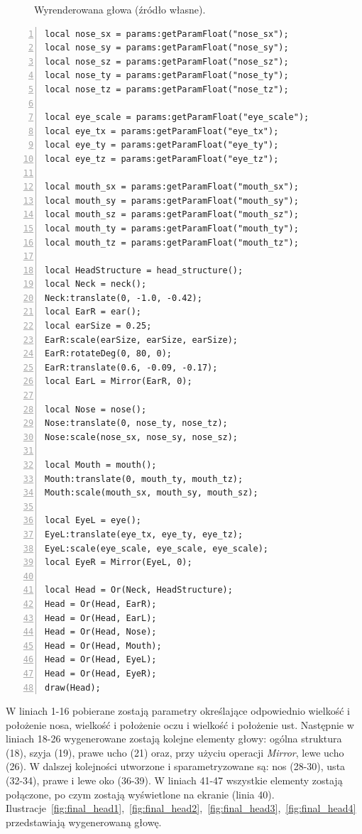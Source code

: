 \begin{figure}[h!]
  \caption{Wyrenderowana głowa (źródło własne).}
  \label{fig:final_head}
\end{figure}

{
\small
\begin{lstlisting}[numbers=left,frame=single,numberstyle=\tiny,backgroundcolor=\color{code_back},breaklines=true]
local nose_sx = params:getParamFloat("nose_sx");
local nose_sy = params:getParamFloat("nose_sy");
local nose_sz = params:getParamFloat("nose_sz");
local nose_ty = params:getParamFloat("nose_ty");
local nose_tz = params:getParamFloat("nose_tz");

local eye_scale = params:getParamFloat("eye_scale");
local eye_tx = params:getParamFloat("eye_tx");
local eye_ty = params:getParamFloat("eye_ty");
local eye_tz = params:getParamFloat("eye_tz");

local mouth_sx = params:getParamFloat("mouth_sx");
local mouth_sy = params:getParamFloat("mouth_sy");
local mouth_sz = params:getParamFloat("mouth_sz");
local mouth_ty = params:getParamFloat("mouth_ty");
local mouth_tz = params:getParamFloat("mouth_tz");

local HeadStructure = head_structure();
local Neck = neck();
Neck:translate(0, -1.0, -0.42);
local EarR = ear();
local earSize = 0.25;
EarR:scale(earSize, earSize, earSize);
EarR:rotateDeg(0, 80, 0);
EarR:translate(0.6, -0.09, -0.17);
local EarL = Mirror(EarR, 0);

local Nose = nose();
Nose:translate(0, nose_ty, nose_tz);
Nose:scale(nose_sx, nose_sy, nose_sz);

local Mouth = mouth();
Mouth:translate(0, mouth_ty, mouth_tz);
Mouth:scale(mouth_sx, mouth_sy, mouth_sz);

local EyeL = eye();
EyeL:translate(eye_tx, eye_ty, eye_tz);
EyeL:scale(eye_scale, eye_scale, eye_scale);
local EyeR = Mirror(EyeL, 0);

local Head = Or(Neck, HeadStructure);
Head = Or(Head, EarR);
Head = Or(Head, EarL);
Head = Or(Head, Nose);
Head = Or(Head, Mouth);
Head = Or(Head, EyeL);
Head = Or(Head, EyeR);
draw(Head);
\end{lstlisting}
}

W liniach 1-16 pobierane zostają parametry określające odpowiednio wielkość i
położenie nosa, wielkość i położenie oczu i wielkość i położenie ust. Następnie
w liniach 18-26 wygenerowane zostają kolejne elementy głowy: ogólna struktura
(18), szyja (19), prawe ucho (21) oraz, przy użyciu operacji \emph{Mirror}, lewe
ucho (26). W dalszej kolejności utworzone i sparametryzowane są: nos (28-30),
usta (32-34), prawe i lewe oko (36-39). W liniach 41-47 wszystkie
elementy zostają połączone, po czym zostają wyświetlone na ekranie (linia 40).
Ilustracje~\ref{fig:final_head1},~\ref{fig:final_head2},~\ref{fig:final_head3},~\ref{fig:final_head4}
przedstawiają wygenerowaną głowę.
